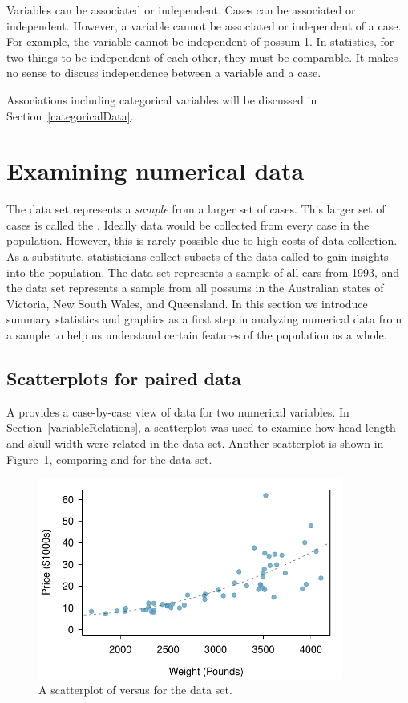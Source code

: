 Variables can be associated or independent. Cases can be associated or independent. However, a variable cannot be associated or independent of a case. For example, the  variable cannot be independent of possum 1. In statistics, for two things to be independent of each other, they must be comparable. It makes no sense to discuss independence between a variable and a case. 

Associations including categorical variables will be discussed in Section~\ref{categoricalData}.

\section{Examining numerical data}
\label{numericalData}

The  data set represents a \emph{sample} from a larger set of cases. This larger set of cases is called the . Ideally data would be collected from every case in the population. However, this is rarely possible due to high costs of data collection. As a substitute, statisticians collect subsets of the data called  to gain insights into the population. The  data set represents a sample of all cars from 1993, and the  data set represents a sample from all possums in the Australian states of Victoria, New South Wales, and Queensland. In this section we introduce summary statistics and graphics as a first step in analyzing numerical data from a sample to help us understand certain features of the population as a whole.

\subsection{Scatterplots for paired data}
\label{scatterPlots}

A  provides a case-by-case view of data for two numerical variables. In Section~\ref{variableRelations}, a scatterplot was used to examine how head length and skull width were related in the  data set. Another scatterplot is shown in Figure~\ref{carsPriceVsWeight}, comparing  and  for the  data set.
\begin{figure}[h]
   \centering
   \includegraphics[height=2.6in]{01/figures/carsPriceVsWeight/carsPriceVsWeight}
   \caption{A scatterplot of  versus  for the  data set.}
   \label{carsPriceVsWeight}
\end{figure}

